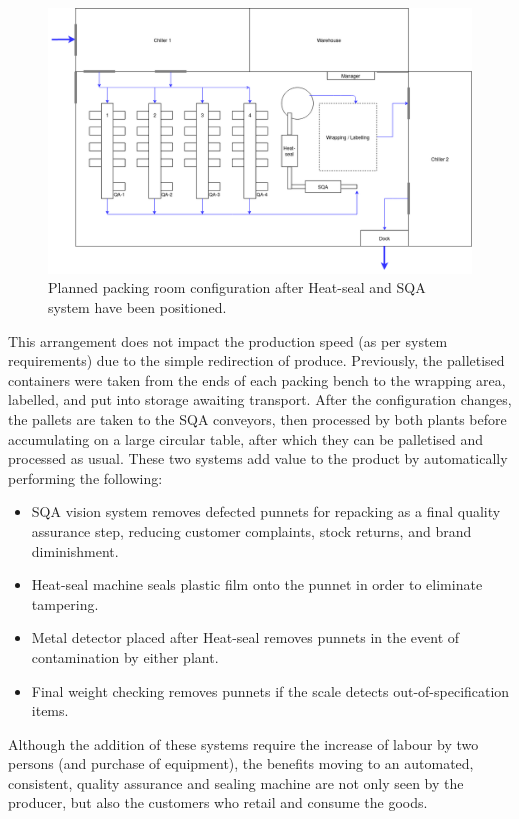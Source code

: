 \documentclass[fleqn,twoside,12pt]{report}
\begin{document}
\begin{figure}[h]
	\centering
	\includegraphics[width=.95\linewidth]{Pack_layout_2.png}
	\caption{Planned packing room configuration after Heat-seal and SQA system have been positioned.}
	\label{fig:pack_layout_2}
\end{figure}%


This arrangement does not impact the production speed (as per system requirements) due to the simple redirection of produce. Previously, the palletised containers were taken from the ends of each packing bench to the wrapping area, labelled, and put into storage awaiting transport. After the configuration changes, the pallets are taken to the SQA conveyors, then processed by both plants before accumulating on a large circular table, after which they can be palletised and processed as usual. These two systems add value to the product by automatically performing the following:

\begin{itemize}
	\item SQA vision system removes defected punnets for repacking as a final quality assurance step, reducing customer complaints, stock returns, and brand diminishment. 
	\item Heat-seal machine seals plastic film onto the punnet in order to eliminate tampering.
	\item Metal detector placed after Heat-seal removes punnets in the event of contamination by either plant.
	\item Final weight checking removes punnets if the scale detects out-of-specification items.
\end{itemize}  


Although the addition of these systems require the increase of labour by two persons (and purchase of equipment), the benefits moving to an automated, consistent, quality assurance and sealing machine are not only seen by the producer, but also the customers who retail and consume the goods.
\end{document}
